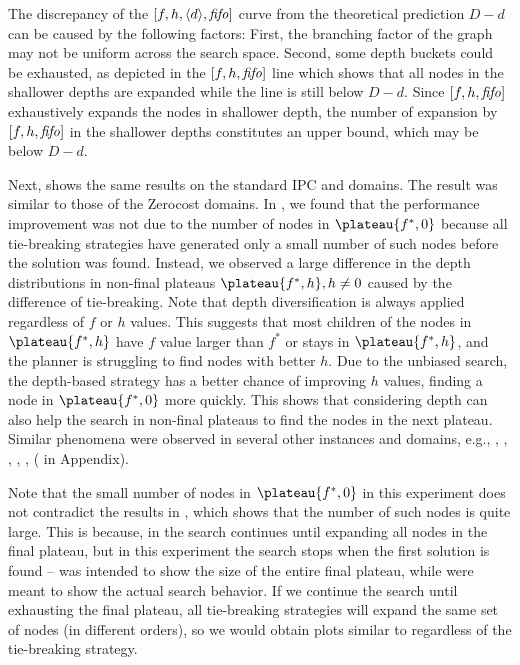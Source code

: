 The discrepancy of the $[f,h,{\left<d\right>},{\text{\textit{fifo}}}]$ curve from the theoretical prediction $D-d$ can be caused by the 
following factors: First, the branching factor of the graph may not be
uniform across the search space. Second, some depth buckets could be
exhausted, as depicted in the  $[f,h,{\text{\textit{fifo}}}]$ line which
shows that all nodes in the shallower depths are expanded while the line is still below $D-d$.
Since $[f,h,{\text{\textit{fifo}}}]$ exhaustively expands the nodes in shallower depth,
the number of expansion by $[f,h,{\text{\textit{fifo}}}]$ in the shallower depths constitutes an upper bound, which may be below $D-d$.

Next,  shows the same results on the standard IPC
 and  domains.
The  result was similar to those of the Zerocost domains.
In ,
we found that the performance improvement was not due to the number of nodes in $\plateau{f^*,0}$ because all tie-breaking strategies have generated only a small number of such nodes before the solution was found.
Instead, we observed a large difference in the depth distributions in non-final plateaus $\plateau{f^*,h}, h\not=0$ caused by the difference of tie-breaking.
Note that depth diversification is always applied regardless of $f$ or $h$ values.
This suggests that most children of the nodes in $\plateau{f^*,h}$ have $f$ value larger than $f^*$ or stays in $\plateau{f^*,h}$, and the planner is struggling to find nodes with better $h$.
Due to the unbiased search, the depth-based strategy has a better chance of improving $h$ values, finding a node in $\plateau{f^*,0}$ more quickly.
This shows that considering depth can also help the search in non-final plateaus to find the nodes in the next plateau.
Similar phenomena were observed in several other instances and domains, e.g., , , , , ,  ( in Appendix).

Note that the small number of nodes in $\plateau{f^*,0}$ in this experiment does not contradict the results in ,  which shows that  the number of such nodes is quite large.
This is because, in  the search continues until expanding all nodes in the final plateau, but in this experiment the search stops when the first solution is found --   was intended to show the size of the entire final plateau, while  were meant to show the actual search behavior. If we continue the search until exhausting the final plateau, all tie-breaking strategies will expand the same set of nodes (in different orders), so we would obtain plots similar to  regardless of the tie-breaking strategy.

